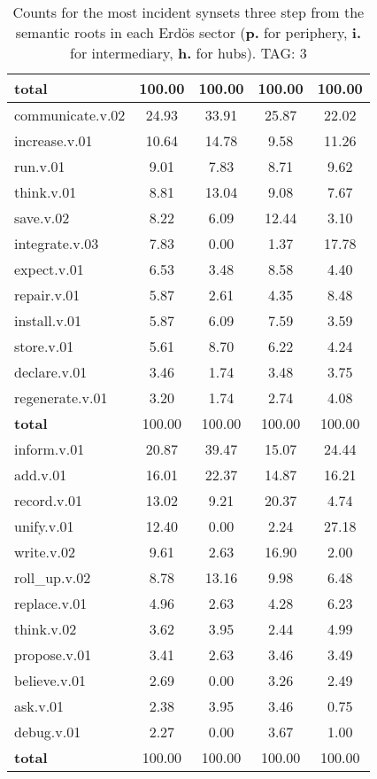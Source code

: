 \begin{table}[h!]
\begin{center}
\begin{tabular}{| l || c | c | c | c |}
{{\bf total}} & 100.00  & 100.00  & 100.00  & 100.00 \\\hline\hline\hline
communicate.v.02 & 24.93  & 33.91  & 25.87  & 22.02 \\\hline
increase.v.01 & 10.64  & 14.78  & 9.58  & 11.26 \\\hline
run.v.01 & 9.01  & 7.83  & 8.71  & 9.62 \\\hline
think.v.01 & 8.81  & 13.04  & 9.08  & 7.67 \\\hline
save.v.02 & 8.22  & 6.09  & 12.44  & 3.10 \\\hline
integrate.v.03 & 7.83  & 0.00  & 1.37  & 17.78 \\\hline
expect.v.01 & 6.53  & 3.48  & 8.58  & 4.40 \\\hline
repair.v.01 & 5.87  & 2.61  & 4.35  & 8.48 \\\hline
install.v.01 & 5.87  & 6.09  & 7.59  & 3.59 \\\hline
store.v.01 & 5.61  & 8.70  & 6.22  & 4.24 \\\hline
declare.v.01 & 3.46  & 1.74  & 3.48  & 3.75 \\\hline
regenerate.v.01 & 3.20  & 1.74  & 2.74  & 4.08 \\\hline\hline
{{\bf total}} & 100.00  & 100.00  & 100.00  & 100.00 \\\hline\hline\hline
inform.v.01 & 20.87  & 39.47  & 15.07  & 24.44 \\\hline
add.v.01 & 16.01  & 22.37  & 14.87  & 16.21 \\\hline
record.v.01 & 13.02  & 9.21  & 20.37  & 4.74 \\\hline
unify.v.01 & 12.40  & 0.00  & 2.24  & 27.18 \\\hline
write.v.02 & 9.61  & 2.63  & 16.90  & 2.00 \\\hline
roll\_up.v.02 & 8.78  & 13.16  & 9.98  & 6.48 \\\hline
replace.v.01 & 4.96  & 2.63  & 4.28  & 6.23 \\\hline
think.v.02 & 3.62  & 3.95  & 2.44  & 4.99 \\\hline
propose.v.01 & 3.41  & 2.63  & 3.46  & 3.49 \\\hline
believe.v.01 & 2.69  & 0.00  & 3.26  & 2.49 \\\hline
ask.v.01 & 2.38  & 3.95  & 3.46  & 0.75 \\\hline
debug.v.01 & 2.27  & 0.00  & 3.67  & 1.00 \\\hline\hline
{{\bf total}} & 100.00  & 100.00  & 100.00  & 100.00 \\\hline
\end{tabular}
\caption{Counts for the most incident synsets three step from the semantic roots in each Erd\"os sector ({\bf p.} for periphery, {\bf i.} for intermediary, {\bf h.} for hubs). TAG: 3}
\end{center}
\end{table}